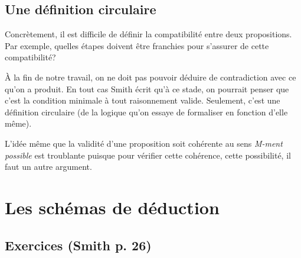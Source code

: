\documentclass[fleqn,a4paper,nobib]{tufte-handout}
\begin{document}
\subsection{Une définition circulaire}

Concrètement, il est difficile de définir la compatibilité entre deux
propositions. Par exemple, quelles étapes doivent être franchies
pour s'assurer
de cette compatibilité?

À la fin de notre travail, on ne doit pas pouvoir déduire de
contradiction avec ce qu'on a produit. En tout cas Smith écrit
qu'à ce stade, on pourrait penser que c'est la condition
minimale à tout raisonnement valide. Seulement, c'est une définition
circulaire (de la logique qu'on essaye de formaliser en fonction
d'elle même).

L'idée même que la validité d'une proposition soit cohérente au
sens \textit{M-ment possible} est troublante puisque pour
vérifier cette cohérence, cette possibilité, il faut un autre
argument.

\section{Les schémas de déduction}


\subsection*{Exercices (Smith p. 26)}
\end{document}
